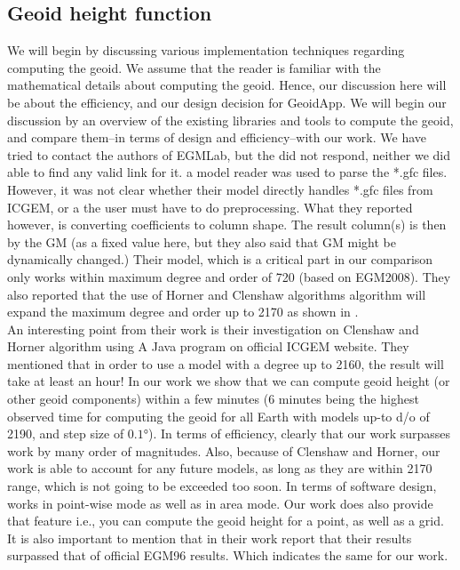  

\subsection{Geoid height function}

We will begin by discussing various implementation techniques regarding computing the geoid. We assume that the reader is familiar with the mathematical details about computing the geoid. Hence, our discussion here will be about the efficiency, and our design decision for GeoidApp. We will begin our discussion by an overview of the existing libraries and tools to compute the geoid, and compare them--in terms of design and efficiency--with our work. We have tried to contact the authors of EGMLab, but the did not respond, neither we did able to find any valid link for it. \cite{egmlab} a model reader was used to parse the *.gfc files. However, it was not clear whether their model directly handles *.gfc files from ICGEM, or a the user must have to do preprocessing. What they reported however, is converting coefficients to column shape. The result column(s) is then by the GM (as a fixed value here, but they also said that GM might be dynamically changed.) Their model, which is a critical part in our comparison only works within maximum degree and order of 720 (based on EGM2008). They also reported that the use of Horner and Clenshaw algorithms algorithm will expand the maximum degree and order up to 2170 as shown in \cite{holmes}.
\\
 An interesting point from their work is their investigation on Clenshaw and Horner algorithm using A Java program on official ICGEM website. They mentioned that in order to use a model with a degree up to 2160, the result will take at least an hour! In our work we show that we can compute geoid height (or other geoid components) within a few minutes (6 minutes being the highest observed time for computing the geoid for all Earth with models up-to d/o of 2190, and step size of $0.1 \si{\degree}$). In terms of efficiency, clearly that our work surpasses \cite{egmlab} work by many order of magnitudes. Also, because of Clenshaw and Horner, our work is able to account for any future models, as long as they are within 2170 range, which is not going to be exceeded too soon. In terms of software design, \cite{egmlab} works in point-wise mode as well as in area mode. Our work does also provide that feature i.e., you can compute the geoid height for a point, as well as a grid. It is also important to mention that \cite{egmlab} in their work report that their results surpassed that of official EGM96 results. Which indicates the same for our work.
